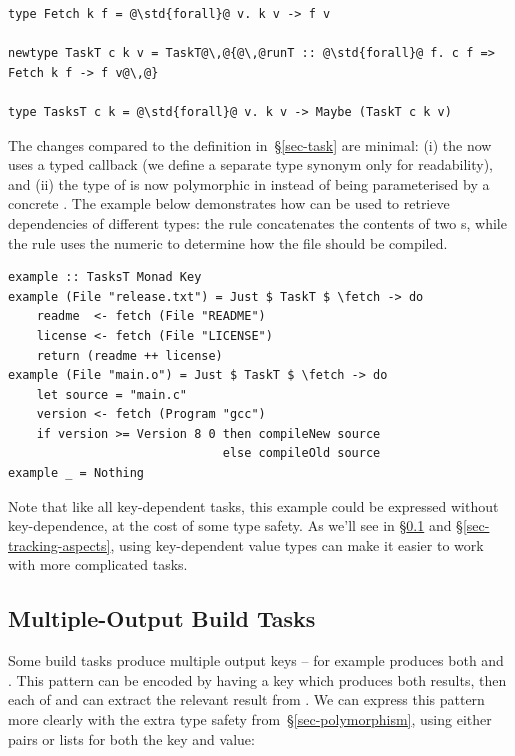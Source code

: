\vspace{1mm}
\begin{verbatim}
type Fetch k f = @\std{forall}@ v. k v -> f v

newtype TaskT c k v = TaskT@\,@{@\,@runT :: @\std{forall}@ f. c f => Fetch k f -> f v@\,@}

type TasksT c k = @\std{forall}@ v. k v -> Maybe (TaskT c k v)
\end{verbatim}
\vspace{1mm}

\noindent
The changes compared to the definition in~\S\ref{sec-task} are minimal: (i) the
 now uses a typed  callback (we define a separate type
synonym only for readability), and (ii) the type of  is now
polymorphic in  instead of being parameterised by a concrete . The
example below demonstrates how  can be used to retrieve dependencies
of different types: the rule  concatenates the contents of two
s, while the rule  uses the numeric  to
determine how the  file should be compiled.

\vspace{1mm}
\begin{verbatim}
example :: TasksT Monad Key
example (File "release.txt") = Just $ TaskT $ \fetch -> do
    readme  <- fetch (File "README")
    license <- fetch (File "LICENSE")
    return (readme ++ license)
example (File "main.o") = Just $ TaskT $ \fetch -> do
    let source = "main.c"
    version <- fetch (Program "gcc")
    if version >= Version 8 0 then compileNew source
                              else compileOld source
example _ = Nothing
\end{verbatim}
\vspace{1mm}

Note that like all key-dependent tasks, this example could be expressed
without key-dependence, at the cost of some type safety. As we'll see in
\S\ref{sec-multiple-outputs} and \S\ref{sec-tracking-aspects}, using key-dependent
value types can make it easier to work with more complicated tasks.

\subsection{Multiple-Output Build Tasks}\label{sec-multiple-outputs}

Some build tasks produce multiple output keys -- for example  produces both
 and . This pattern can be encoded by having a key  which produces
both results, then each of  and  can extract the relevant result
from . We can express this pattern more clearly with the extra type safety
from~\S\ref{sec-polymorphism}, using either pairs or lists for both the key and value:

